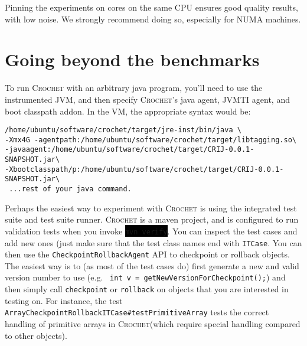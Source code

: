 \documentclass[12pt]{article}
\newcommand{\command}[1]{\colorbox{black}{\texttt{\color{white}#1}}}
\newcommand{\sysname}{\textsc{Crochet}\xspace}
\begin{document}
Pinning the experiments on cores on the same CPU ensures good quality results,
with low noise.  We strongly recommend doing so, especially for NUMA machines.

\section{Going beyond the benchmarks}
To run \sysname with an arbitrary java program, you'll need to use the instrumented JVM, and then specify \sysname's java agent, JVMTI agent, and boot classpath addon. In the VM, the appropriate syntax would be:
\begin{verbatim}
/home/ubuntu/software/crochet/target/jre-inst/bin/java \
-Xmx4G -agentpath:/home/ubuntu/software/crochet/target/libtagging.so\
-javaagent:/home/ubuntu/software/crochet/target/CRIJ-0.0.1-SNAPSHOT.jar\
-Xbootclasspath/p:/home/ubuntu/software/crochet/target/CRIJ-0.0.1-SNAPSHOT.jar\
 ...rest of your java command.	
\end{verbatim}
 
 
 Perhaps the easiest way to experiment with \sysname is using the integrated test suite and test suite runner. \sysname is a maven project, and is configured to run validation tests when you invoke \command{mvn verify}. You can inspect the test cases and add new ones (just make sure that the test class names end with \texttt{ITCase}. You can then use the \texttt{CheckpointRollbackAgent} API to checkpoint or rollback objects. The easiest way is to (as most of the test cases do) first generate a new and valid version number to use (e.g. \texttt{		int v = getNewVersionForCheckpoint();}) and then simply call \texttt{checkpoint} or \texttt{rollback} on objects that you are interested in testing on. For instance, the test \texttt{ArrayCheckpointRollbackITCase\#testPrimitiveArray} tests the correct handling of primitive arrays in \sysname (which require special handling compared to other objects).
 
\end{document}
